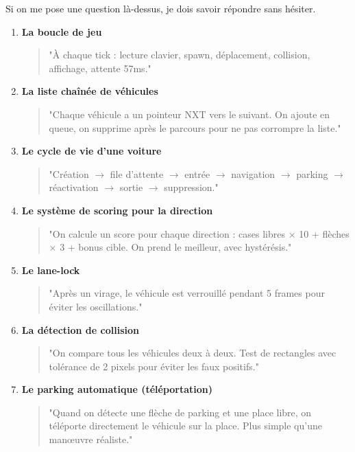 \documentclass[11pt,a4paper]{article}
\begin{document}
\begin{keybox}
Si on me pose une question là-dessus, je dois savoir répondre sans hésiter.
\end{keybox}

\begin{enumerate}
    \item \textbf{La boucle de jeu}
    \begin{quote}
    "À chaque tick : lecture clavier, spawn, déplacement, collision, affichage, attente 57ms."
    \end{quote}

    \item \textbf{La liste chaînée de véhicules}
    \begin{quote}
    "Chaque véhicule a un pointeur NXT vers le suivant. On ajoute en queue, on supprime après le parcours pour ne pas corrompre la liste."
    \end{quote}

    \item \textbf{Le cycle de vie d'une voiture}
    \begin{quote}
    "Création $\rightarrow$ file d'attente $\rightarrow$ entrée $\rightarrow$ navigation $\rightarrow$ parking $\rightarrow$ réactivation $\rightarrow$ sortie $\rightarrow$ suppression."
    \end{quote}

    \item \textbf{Le système de scoring pour la direction}
    \begin{quote}
    "On calcule un score pour chaque direction : cases libres × 10 + flèches × 3 + bonus cible. On prend le meilleur, avec hystérésis."
    \end{quote}

    \item \textbf{Le lane-lock}
    \begin{quote}
    "Après un virage, le véhicule est verrouillé pendant 5 frames pour éviter les oscillations."
    \end{quote}

    \item \textbf{La détection de collision}
    \begin{quote}
    "On compare tous les véhicules deux à deux. Test de rectangles avec tolérance de 2 pixels pour éviter les faux positifs."
    \end{quote}

    \item \textbf{Le parking automatique (téléportation)}
    \begin{quote}
    "Quand on détecte une flèche de parking et une place libre, on téléporte directement le véhicule sur la place. Plus simple qu'une manœuvre réaliste."
    \end{quote}


\end{enumerate}
\end{document}
